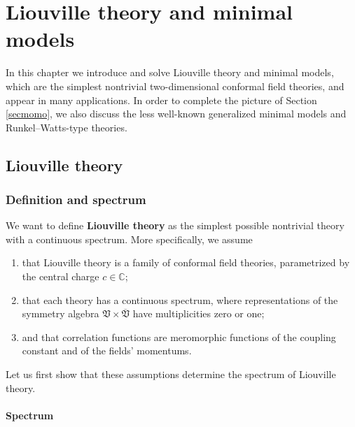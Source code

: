 \documentclass[12pt, a4paper, notitlepage, twoside]{report}
\numberwithin{equation}{section}
\theoremstyle{break}
\begin{document}

\cleardoublepage

\chapter{Liouville theory and minimal models \label{seccbm}}

In this chapter we introduce and solve Liouville theory and minimal models, which are the simplest nontrivial two-dimensional conformal field theories, and appear in many applications. In order to complete the picture of Section \ref{secmomo}, we also discuss the less well-known generalized minimal models and Runkel--Watts-type theories. 

\section{Liouville theory \label{secliou}}

\subsection{Definition and spectrum \label{secspe}}

We want to define \textbf{Liouville theory} as the simplest possible nontrivial theory with a continuous spectrum. More specifically, we assume
\begin{enumerate}
 \item that Liouville theory is a family of conformal field theories, parametrized by the central charge $c\in\mathbb{C}$;
\item that each theory has a continuous spectrum, where representations of the symmetry algebra $\mathfrak{V}\times\overline{\mathfrak{V}}$ have multiplicities zero or one;
\item and that correlation functions are meromorphic functions of the coupling constant and of the fields' momentums.
\end{enumerate}
Let us first show that these assumptions determine the spectrum of Liouville theory.

\subsubsection{Spectrum}
\end{document}
